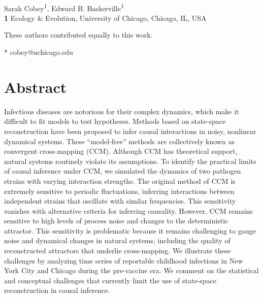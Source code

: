 \documentclass[10pt,letterpaper]{article}
\date{}
\begin{document}
\vspace*{0.2in}

\begin{flushleft}
{\Large
\textbf{} %
}
\newline
\\
Sarah Cobey\textsuperscript{1\Yinyang*},
Edward B. Baskerville\textsuperscript{1\Yinyang}
\\
\bigskip
\textbf{1} Ecology \& Evolution, University of Chicago, Chicago, IL, USA
\\
\bigskip

% 
%
\Yinyang These authors contributed equally to this work.

* cobey@uchicago.edu

\end{flushleft}
\section*{Abstract}

Infectious diseases are notorious for their complex dynamics, which make it difficult to fit models to test hypotheses.
Methods based on state-space reconstruction have been proposed to infer causal interactions in noisy, nonlinear dynamical systems.
These ``model-free'' methods are collectively known as convergent cross-mapping (CCM).
Although CCM has theoretical support, natural systems routinely violate its assumptions.
To identify the practical limits of causal inference under CCM, we simulated the dynamics of two pathogen strains with varying interaction strengths.
The original method of CCM is extremely sensitive to periodic fluctuations, inferring interactions between independent strains that oscillate with similar frequencies.
This sensitivity vanishes with alternative criteria for inferring causality.
However, CCM remains sensitive to high levels of process noise and changes to the deterministic attractor.
This sensitivity is problematic because it remains challenging to gauge noise and dynamical changes in natural systems, including the quality of reconstructed attractors that underlie cross-mapping.
We illustrate these challenges by analyzing time series of reportable childhood infections in New York City and Chicago during the pre-vaccine era.
We comment on the statistical and conceptual challenges that currently limit the use of state-space reconstruction in causal inference.
\end{document}
